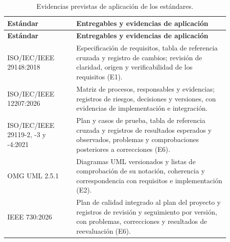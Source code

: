 {\small\setlength{\tabcolsep}{5pt}\renewcommand{\arraystretch}{1.18}
\begin{longtable}{|>{\raggedright\arraybackslash}p{0.28\linewidth}|>{\raggedright\arraybackslash}p{0.62\linewidth}|}
\caption{Evidencias previstas de aplicación de los estándares.}\\\hline
\textbf{Estándar} & \textbf{Entregables y evidencias de aplicación}\\\hline\endfirsthead
\hline\textbf{Estándar} & \textbf{Entregables y evidencias de aplicación}\\\hline\endhead
ISO/IEC/IEEE 29148:2018 & Especificación de requisitos, tabla de referencia cruzada y registro de cambios; revisión de claridad, origen y verificabilidad de los requisitos (E1).\\\hline
ISO/IEC/IEEE 12207:2026 & Matriz de procesos, responsables y evidencias; registros de riesgos, decisiones y versiones, con evidencias de implementación e integración.\\\hline
ISO/IEC/IEEE 29119-2, -3 y -4:2021 & Plan y casos de prueba, tabla de referencia cruzada y registros de resultados esperados y observados, problemas y comprobaciones posteriores a correcciones (E6).\\\hline
OMG UML 2.5.1 & Diagramas UML versionados y listas de comprobación de su notación, coherencia y correspondencia con requisitos e implementación (E2).\\\hline
IEEE 730:2026 & Plan de calidad integrado al plan del proyecto y registros de revisión y seguimiento por versión, con problemas, correcciones y resultados de reevaluación (E6).\\\hline
\end{longtable}}